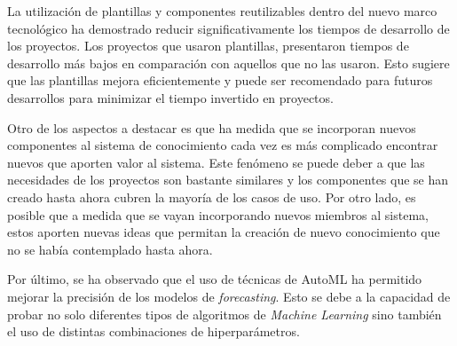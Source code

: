 La utilización de plantillas y componentes reutilizables dentro del nuevo 
marco tecnológico ha demostrado reducir significativamente los tiempos de 
desarrollo de los proyectos. Los proyectos que usaron plantillas, 
presentaron tiempos de desarrollo más bajos en comparación con aquellos que no 
las usaron. Esto sugiere que las plantillas mejora eficientemente y puede ser 
recomendado para futuros desarrollos para minimizar el tiempo invertido en proyectos.\medskip

Otro de los aspectos a destacar es que ha medida que se incorporan nuevos componentes 
al sistema de conocimiento cada vez es más complicado encontrar nuevos que aporten
valor al sistema. Este fenómeno se puede deber a que las necesidades de los proyectos
son bastante similares y los componentes que se han creado hasta ahora cubren la mayoría
de los casos de uso. Por otro lado, es posible que a medida que se vayan incorporando
nuevos miembros al sistema, estos aporten nuevas ideas que permitan la creación de nuevo
conocimiento que no se había contemplado hasta ahora.\medskip

Por último, se ha observado que el uso de técnicas de AutoML ha permitido mejorar
la precisión de los modelos de \textit{forecasting}. Esto se debe a la capacidad de
probar no solo diferentes tipos de algoritmos de \textit{Machine Learning} sino también el uso
de distintas combinaciones de hiperparámetros. 
